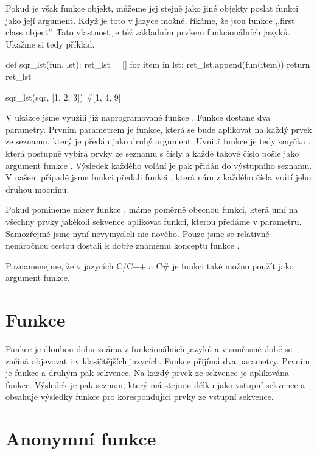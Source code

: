 Pokud je však funkce objekt, můžeme jej stejně jako jiné objekty poslat funkci jako její argument.
Když je toto v jazyce možné, říkáme, že jsou funkce ,,first class object''. Tato vlastnost
je též základním prvkem funkcionálních jazyků. Ukažme si tedy příklad.

\begin{python}
def sqr_lst(fun, lst):
    ret_lst = []
    for item in lst:
        ret_lst.append(fun(item))
    return ret_lst

sqr_lst(sqr, [1, 2, 3])
#[1, 4, 9]
\end{python}

V ukázce jsme využili již naprogramované funkce . Funkce 
dostane dva parametry. Prvním parametrem je funkce, která se bude aplikovat na každý prvek ze seznamu,
který je předán jako druhý argument. Uvnitř funkce je tedy smyčka , která postupně
vybírá prvky ze seznamu s čísly a každé takové číslo pošle jako argument funkce . Výsledek každého volání je pak přidán do výstupního seznamu. V našem případě jsme funkci  předali
funkci , která nám z každého čísla vrátí jeho druhou mocninu. 

Pokud pomineme název funkce , máme poměrně obecnou funkci, která umí na všechny
prvky jakékoli sekvence aplikovat funkci, kterou předáme v parametru. Samozřejmě jsme
nyní nevymysleli nic nového. Pouze jsme se relativně nenáročnou cestou dostali k dobře známému
konceptu funkce .

Poznamenejme, že v jazycích C/C++ a C\# je funkci také možno použít jako argument funkce.

\section{Funkce }

Funkce  je dlouhou dobu známa z funkcionálních jazyků a v současné době se začíná objevovat
i v klasičtějších jazycích. Funkce přijímá dva parametry. Prvním je funkce a druhým pak sekvence.
Na kazdý prvek ze sekvence je aplikována funkce. Výsledek je pak seznam, který má stejnou délku
jako vstupní sekvence a obsahuje výsledky funkce pro korespondující prvky ze vstupní sekvence.

\section{Anonymní funkce}

